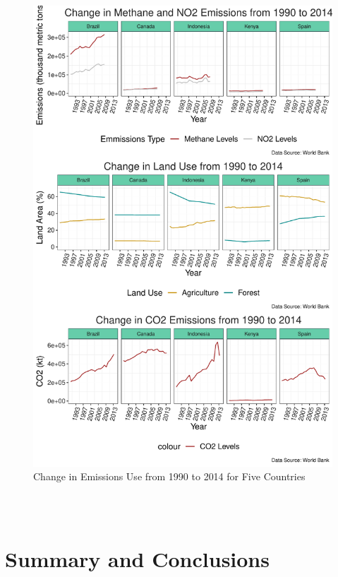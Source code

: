 \documentclass[12pt,]{article}
\begin{document}
\begin{figure}
\centering
\includegraphics{Marx_ENV872_Project_files/figure-latex/unnamed-chunk-12-1.pdf}
\caption{\label{fig:fig6}Change in Emissions Use from 1990 to 2014 for
Five Countries}
\end{figure}

\begin{verbatim}


\end{verbatim}

\begin{verbatim}

\end{verbatim}

\newpage

\section{Summary and Conclusions}\label{summary-and-conclusions}
\end{document}
